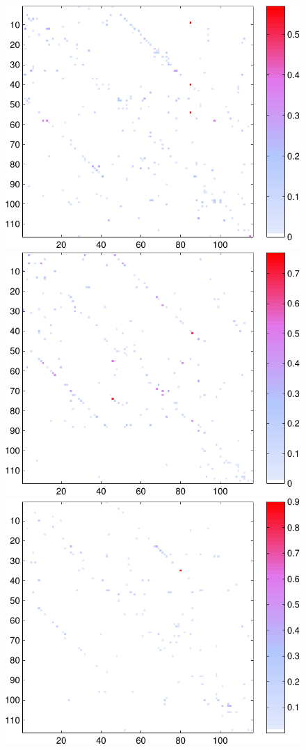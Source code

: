 \documentclass[a4paper, english]{article}
\begin{document}
\begin{figure}[h!]
\begin{minipage}[t]{1.2\textwidth}
  \includegraphics[height=0.26\textheight]{images/new/assym_subj3_expl-crop}
  \includegraphics[height=0.26\textheight]{images/new/assym_subj4_expl-crop}
  \includegraphics[height=0.26\textheight]{images/new/assym_subj5_expl-crop}

\end{minipage}
\end{figure}
\end{document}
